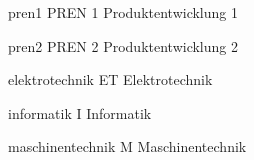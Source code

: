 \newacronym
  {pren1}                 %
  {PREN 1}                %
  {Produktentwicklung 1}  %

\newacronym
  {pren2}                 %
  {PREN 2}                %
  {Produktentwicklung 2}  %

\newacronym
  {elektrotechnik}                    %
  {ET}                    %
  {Elektrotechnik}        %

\newacronym
  {informatik}             %
  {I}                      %
  {Informatik}             %
  
\newacronym
  {maschinentechnik}       %
  {M}                      %
  {Maschinentechnik}       %